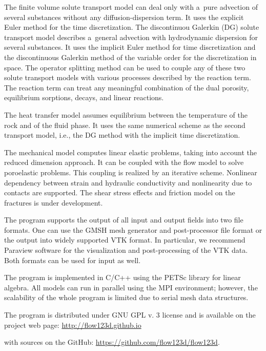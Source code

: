The finite volume solute transport model can deal only with a~pure advection of several substances without any diffusion-dispersion term. 
It uses the explicit Euler method for the time discretization.
The discontinuou Galerkin  (DG) solute transport model describes a~general advection with hydrodynamic dispersion for several substances.
It uses the implicit Euler method for time discretization and the discontinuous Galerkin method of
the variable order for the discretization in space. The operator splitting method can be used to couple any of these two solute 
transport models with various processes described by the reaction term. The reaction term can treat any meaningful combination 
of the dual porosity, equilibrium sorptions, decays, and linear reactions.

The heat transfer model assumes equilibrium between the temperature of the rock and of the fluid phase. It uses the same 
numerical scheme as the second transport model, i.e., the DG method with the implicit time discretization.

The mechanical model computes linear elastic problems, taking into account the reduced dimension approach.
It can be coupled with the flow model to solve poroelastic problems. This coupling is realized by an iterative scheme. 
Nonlinear dependency between strain and hydraulic conductivity and nonlinearity due to contacts are supported. 
The shear stress effects and friction model on the fractures is under development.

The program supports the output of all input and output fields into two file formats. One can use the GMSH mesh generator and 
post-processor file format or the output into widely supported VTK format. In particular, we recommend Paraview software for 
the visualization and post-processing of the VTK data. Both formats can be used for input as well.

The program is implemented in C/C++ using the PETSc library for linear algebra. All models can run in parallel using the MPI 
environment; however, the scalability of the whole program is limited due to serial mesh data structures.

The program is distributed under GNU GPL v. 3 license and is available on the project web page:
\url{http://flow123d.github.io}

with sources on the GitHub:
\url{https://github.com/flow123d/flow123d}.



